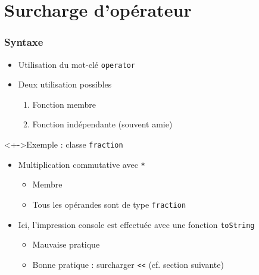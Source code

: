 \section{Surcharge d'opérateur}

\begin{frame}
\frametitle{Syntaxe}
\begin{itemize}[<+->]
\item Utilisation du mot-clé \lstinline|operator|
\item Deux utilisation possibles
	\begin{enumerate}
	\item Fonction membre
	\item Fonction indépendante (souvent amie)
	\end{enumerate}
\end{itemize}
\begin{exampleblock}<+->{Exemple : classe \texttt{fraction}}
	\begin{itemize}[<+->]
	\item Multiplication commutative avec \texttt{*}
		\begin{itemize}
		\item Membre
		\item Tous les opérandes sont de type \texttt{fraction}
		\end{itemize}	
	\end{itemize}
\end{exampleblock}
\begin{itemize}[<+->]
\item Ici, l'impression console est effectuée avec une fonction \texttt{toString}
	\begin{itemize}
	\item Mauvaise pratique
	\item Bonne pratique : surcharger \texttt{<<} (cf. section suivante)
	\end{itemize}
\end{itemize}
\end{frame}

